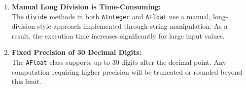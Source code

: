 \documentclass{article}
\begin{document}
\begin{enumerate}
    \item \textbf{Manual Long Division is Time-Consuming:} \\
    The \texttt{divide} methods in both \texttt{AInteger} and \texttt{AFloat} use a manual, long-division-style approach implemented through string manipulation. As a result, the execution time increases significantly for large input values.

    \item \textbf{Fixed Precision of 30 Decimal Digits:} \\
    The \texttt{AFloat} class supports up to 30 digits after the decimal point. Any computation requiring higher precision will be truncated or rounded beyond this limit.
\end{enumerate}
\end{document}
